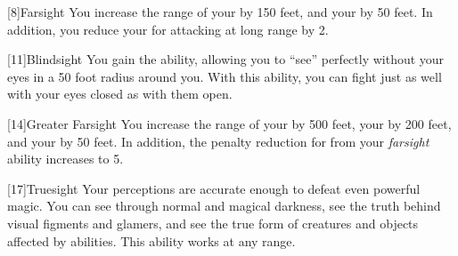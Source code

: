             [8]{Farsight}
            You increase the range of your  by 150 feet, and your  by 50 feet.
            In addition, you reduce your  for attacking at long range by 2.

            [11]{Blindsight}
            You gain the  ability, allowing you to ``see'' perfectly without your eyes in a 50 foot radius around you.
            With this ability, you can fight just as well with your eyes closed as with them open.

            [14]{Greater Farsight}
            You increase the range of your  by 500 feet, your  by 200 feet, and your  by 50 feet.
            In addition, the penalty reduction for  from your \textit{farsight} ability increases to 5.

            [17]{Truesight} 
            Your perceptions are accurate enough to defeat even powerful magic.
            You can see through normal and magical darkness, see the truth behind visual figments and glamers, and see the true form of creatures and objects affected by  abilities.
            This ability works at any range.

